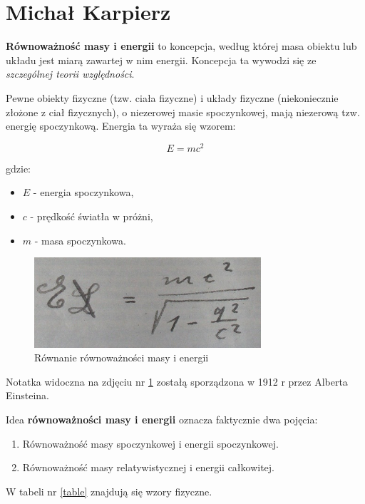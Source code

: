 \section{Michał Karpierz}
\textbf{Równoważność masy i energii} to koncepcja, według której masa obiektu lub układu jest miarą zawartej w nim energii. Koncepcja ta wywodzi się ze \emph{szczególnej teorii względności}.

Pewne obiekty fizyczne (tzw. ciała fizyczne) i układy fizyczne (niekoniecznie złożone z ciał fizycznych), o niezerowej masie spoczynkowej, mają niezerową tzw. energię spoczynkową. Energia ta wyraża się wzorem:

$$E=mc^2$$

gdzie:
\begin{itemize}
    \item $E$ - energia spoczynkowa,
    \item $c$ - prędkość światła w próżni,
    \item $m$ - masa spoczynkowa.
\end{itemize}
\begin{figure}[]
    \centering
    \includegraphics[width=0.75\textwidth, inner]{pictures/E_mc_2_IMG_0859.jpg}
    \caption{Równanie równoważności masy i energii}
    \label{fig:emc}
\end{figure}
Notatka widoczna na zdjęciu nr \ref{fig:emc} zostałą sporządzona w 1912 r przez Alberta Einsteina.

\begin{samepage}
    Idea \textbf{równoważności masy i energii} oznacza faktycznie dwa pojęcia:
    \begin{enumerate}
        \item Równoważność masy spoczynkowej i energii spoczynkowej.
        \item Równoważność masy relatywistycznej i energii całkowitej.
    \end{enumerate}
\end{samepage}



W tabeli nr \ref{table} znajdują się wzory fizyczne.